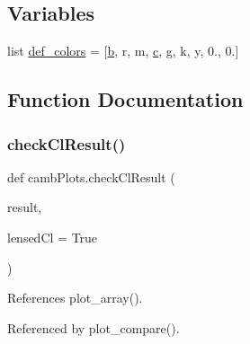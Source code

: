 \subsection*{Variables}
\begin{DoxyCompactItemize}
\item 
list \mbox{\hyperlink{namespacecambPlots_ac3e5045bfeb5c7c0e5dfc22c4eae07a8}{def\+\_\+colors}} = \mbox{[}\textquotesingle{}\mbox{\hyperlink{plotTT_8m_ac0431efac4d7c393d1e70b86115cb93f}{b}}\textquotesingle{}, \textquotesingle{}r\textquotesingle{}, \textquotesingle{}m\textquotesingle{}, \textquotesingle{}\mbox{\hyperlink{plotTT_8m_ad9d1ac02e33c4aed62ad517a7cb8b3fb}{c}}\textquotesingle{}, \textquotesingle{}g\textquotesingle{}, \textquotesingle{}k\textquotesingle{}, \textquotesingle{}y\textquotesingle{}, \textquotesingle{}0.\textquotesingle{}, \textquotesingle{}0.\textquotesingle{}\mbox{]}
\end{DoxyCompactItemize}


\subsection{Function Documentation}
\mbox{\label{namespacecambPlots_a92f653f492e72e931e693f9e0e0a4c6a}} 
\subsubsection{\texorpdfstring{check\+Cl\+Result()}{checkClResult()}}
{\footnotesize\ttfamily def camb\+Plots.\+check\+Cl\+Result (\begin{DoxyParamCaption}\item[{}]{result,  }\item[{}]{lensed\+Cl = {\ttfamily True} }\end{DoxyParamCaption})}



References plot\+\_\+array().



Referenced by plot\+\_\+compare().

